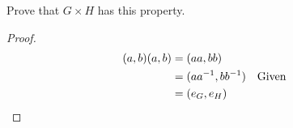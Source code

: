 \documentclass[twoside]{amsart}
\begin{document}
\begin{enumerate}[A.]
\begin{enumerate}[(a)]
      Prove that $G\times H$ has this property.

      \begin{proof}
         \begin{align*}
	    (a,b)(a,b) & = (aa,bb)  \\
	               & = (aa^{-1},bb^{-1}) && \text{Given} \\
		       & = (e_G,e_H) \qedhere
	 \end{align*}
      \end{proof}

   \end{enumerate}
\end{enumerate}
\end{document}
